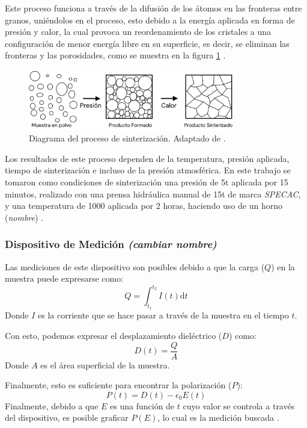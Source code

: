 \documentclass[../main.tex]{subfiles}
\begin{document}
Este proceso funciona a través de la difusión de los átomos en las fronteras entre granos, uniéndolos en el proceso, esto debido a la energía aplicada en forma de presión y calor, la cual provoca un reordenamiento de los cristales a una configuración de menor energía libre en su superficie, es decir, se eliminan las fronteras y las porosidades, como se muestra en la figura \ref{fig:sintdiag} \cite{Ou2014}.
\begin{figure}[H]
    \centering
    \includegraphics[width=0.8\textwidth]{fig/sintdiag.jpg}
    \caption{Diagrama del proceso de sinterización. Adaptado de \cite{Ou2014}.}
    \label{fig:sintdiag}
\end{figure}
Los resultados de este proceso dependen de la temperatura, presión aplicada, tiempo de sinterización e incluso de la presión atmosférica. En este trabajo se tomaron como condiciones de sinterización una presión de 5t aplicada por 15 minutos, realizado con una prensa hidráulica manual de 15t de marca \textit{SPECAC}, y una temperatura de 1000\gradoC{} aplicada por 2 horas, haciendo uso de un horno (\textit{nombre}) \cite{Aparnadevi2016}.

\subsubsection{Dispositivo de Medición \textit{(cambiar nombre)}}
Las mediciones de este dispositivo son posibles debido a que la carga ($Q$) en la muestra puede expresarse como:
\begin{equation}
    Q=\int_{t_1}^{t_2}I(t)\text{d}t
    \label{eq:cargaintensidad}
\end{equation}
Donde $I$ es la corriente que se hace pasar a través de la muestra en el tiempo $t$.

Con esto, podemos expresar el desplazamiento dieléctrico ($D$) como:
\begin{equation}
    D(t)=\dfrac{Q}{A}
    \label{eq:despdielec}
\end{equation}
Donde $A$ es el área superficial de la muestra.

Finalmente, esto es suficiente para encontrar la polarización ($P$):
\begin{equation}
    P(t)=D(t)-\epsilon_0E(t)
    \label{eq:polarizacionec}
\end{equation}
Finalmente, debido a que $E$ es una función de $t$ cuyo valor se controla a través del dispositivo, es posible graficar $P(E)$, lo cual es la medición buscada \cite{Stewart1999}.
\end{document}
